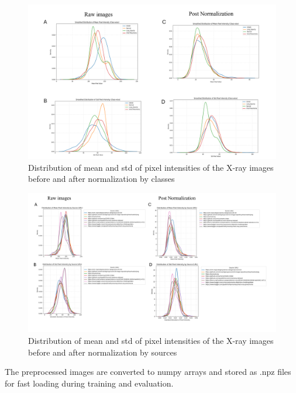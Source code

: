 \documentclass{article}
\begin{document}
\begin{figure}[H] %
    \centering
    \includegraphics[width=1.0\linewidth]{Screenshot 2025-04-21 223200.png}
    \caption{Distribution of mean and std of pixel intensities of the X-ray images before and after normalization by classes}
    \label{fig:KDE_pre_post_normalization_class}
\end{figure}

\begin{figure}[h!] %
    \centering
    \includegraphics[width=1.0\linewidth]{Screenshot 2025-04-21 223207.png}
    \caption{Distribution of mean and std of pixel intensities of the X-ray images before and after normalization by sources}
    \label{fig:KDE_pre_post_normalization_URL}
\end{figure}

The preprocessed images are converted to numpy arrays and stored as .npz files for fast loading during training and evaluation.


\end{document}
